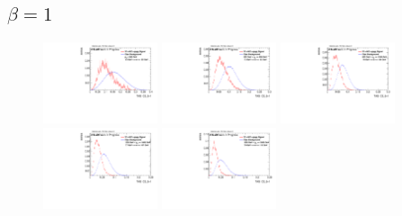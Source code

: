 \subsection*{$\beta=1$}\label{subsec:app_w_1}
\vspace{-0.5cm}
\begin{figure}
\includegraphics[width=0.3\textwidth]{sascha_input/Appendix/Distributions/w/distributions/beta1/h_assisted_tj_C2_bin1.pdf} \hspace{1mm}
\includegraphics[width=0.3\textwidth]{sascha_input/Appendix/Distributions/w/distributions/beta1/h_assisted_tj_C2_bin2.pdf} \hspace{1mm}
\includegraphics[width=0.3\textwidth]{sascha_input/Appendix/Distributions/w/distributions/beta1/h_assisted_tj_C2_bin3.pdf} 
\bigskip
\includegraphics[width=0.3\textwidth]{sascha_input/Appendix/Distributions/w/distributions/beta1/h_assisted_tj_C2_bin4.pdf} \hspace{1mm}
\includegraphics[width=0.3\textwidth]{sascha_input/Appendix/Distributions/w/distributions/beta1/h_assisted_tj_C2_bin5.pdf} \hspace{1mm}

\end{figure}
